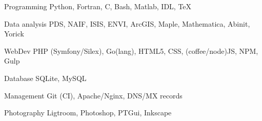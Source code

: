 
\begin{cvskills}

	\cvskill
		{Programming}
    {Python, Fortran, C, Bash, Matlab, IDL, \TeX}

	\cvskill
		{Data analysis}
    {PDS, NAIF, ISIS, ENVI, ArcGIS, Maple, Mathematica, Abinit, Yorick}

	\cvskill
    {WebDev}
    {PHP (Symfony/Silex), Go(lang), HTML5, CSS, (coffee/node)JS, NPM, Gulp}

	\cvskill
    {Database}
    {SQLite, MySQL}

	\cvskill
    {Management}
    {Git (CI), Apache/Nginx, DNS/MX records}

	\cvskill
    {Photography}
    {Ligtroom, Photoshop, PTGui, Inkscape}

\end{cvskills}

